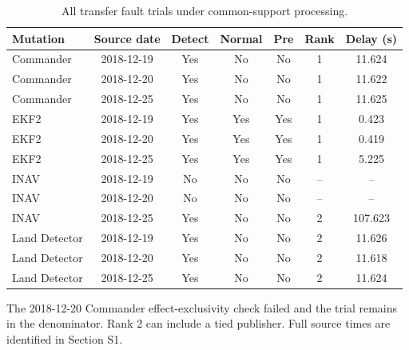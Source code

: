 \begin{table}[htbp]
\centering\footnotesize
\caption{All transfer fault trials under common-support processing.}
\label{tab:s_runs}
\renewcommand{\arraystretch}{1.15}
\setlength{\tabcolsep}{4pt}
\begin{tabular}{lcccccc}
\toprule
Mutation & Source date & Detect & Normal & Pre & Rank & Delay (s)\\
\midrule
Commander & 2018-12-19 & Yes & No & No & 1 & 11.624\\
Commander & 2018-12-20 & Yes & No & No & 1 & 11.622\\
Commander & 2018-12-25 & Yes & No & No & 1 & 11.625\\
EKF2 & 2018-12-19 & Yes & Yes & Yes & 1 & 0.423\\
EKF2 & 2018-12-20 & Yes & Yes & Yes & 1 & 0.419\\
EKF2 & 2018-12-25 & Yes & Yes & Yes & 1 & 5.225\\
INAV & 2018-12-19 & No & No & No & -- & --\\
INAV & 2018-12-20 & No & No & No & -- & --\\
INAV & 2018-12-25 & Yes & No & No & 2 & 107.623\\
Land Detector & 2018-12-19 & Yes & No & No & 2 & 11.626\\
Land Detector & 2018-12-20 & Yes & No & No & 2 & 11.618\\
Land Detector & 2018-12-25 & Yes & No & No & 2 & 11.624\\
\bottomrule
\end{tabular}
\par\smallskip\parbox{0.98\linewidth}{\scriptsize The 2018-12-20 Commander effect-exclusivity check failed and the trial remains in the denominator. Rank 2 can include a tied publisher. Full source times are identified in Section S1.}
\end{table}
